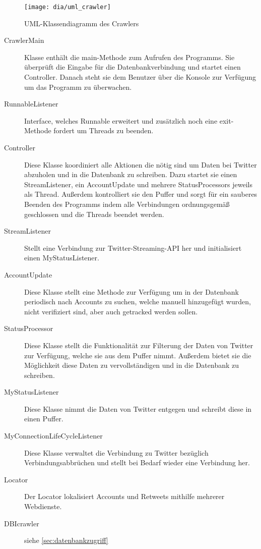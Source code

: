 \begin{figure}[h!]
	\centering
	\texttt{[image: dia/uml\_crawler]}
	\caption{UML-Klassendiagramm des Crawlers}
	\label{fig:uml_crawler}
\end{figure}

\begin{description}
\item[CrawlerMain] Klasse enthält die main-Methode zum Aufrufen des Programms. Sie überprüft die Eingabe für die Datenbankverbindung und startet einen Controller. Danach steht sie dem Benutzer über die Konsole zur Verfügung um das Programm zu überwachen.
\item[RunnableListener] Interface, welches Runnable erweitert und zusätzlich noch eine exit-Methode fordert um Threads zu beenden.
\item[Controller] Diese Klasse koordiniert alle Aktionen die nötig sind um Daten bei Twitter abzuholen und in die Datenbank zu schreiben. Dazu startet sie einen StreamListener, ein AccountUpdate und mehrere StatusProcessors jeweils als Thread. Außerdem kontrolliert sie den Puffer und sorgt für ein sauberes Beenden des Programms indem alle Verbindungen ordnungsgemäß geschlossen und die Threads beendet werden.
\item[StreamListener] Stellt eine Verbindung zur Twitter-Streaming-API her und initialisiert einen MyStatusListener.
\item[AccountUpdate] Diese Klasse stellt eine Methode zur Verfügung um in der Datenbank periodisch nach Accounts zu suchen, welche manuell hinzugefügt wurden, nicht verifiziert sind, aber auch getracked werden sollen.
\item[StatusProcessor] Diese Klasse stellt die Funktionalität zur Filterung der Daten von Twitter zur Verfügung, welche sie aus dem Puffer nimmt. Außerdem bietet sie die Möglichkeit diese Daten zu vervollständigen und in die Datenbank zu schreiben.
\item[MyStatusListener] Diese Klasse nimmt die Daten von Twitter entgegen und schreibt diese in einen Puffer.
\item[MyConnectionLifeCycleListener] Diese Klasse verwaltet die Verbindung zu Twitter bezüglich Verbindungsabbrüchen und stellt bei Bedarf wieder eine Verbindung her.
\item[Locator] Der Locator lokalisiert Accounts und Retweets mithilfe mehrerer Webdienste.
\item[DBIcrawler] siehe \cref{sec:datenbankzugriff}
\end{description}

